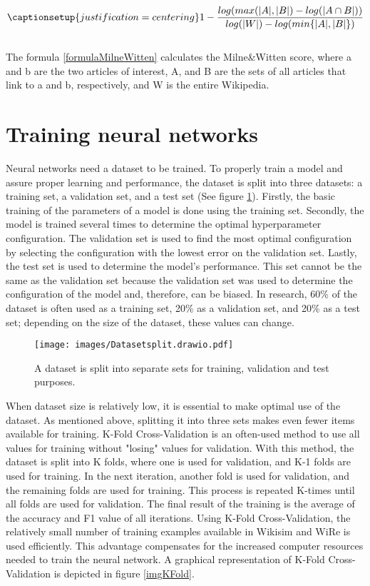 \begin{equation}
\captionsetup{justification=centering}
\label{formulaMilneWitten}
1 -\frac{ log( max( |A|, | B| )-log(| A \cap B|))}{log(|W|)-log(min\{|A|, |B|\})}
\end{equation}
\\ 
The formula \ref{formulaMilneWitten} calculates the Milne\&Witten score, where a and b are the two articles of interest, A, and B are the sets of all articles that link to a and b, respectively, and W is the entire Wikipedia.

\section{Training neural networks}
\label{training}
\label{secTrainingNeuralNetworks}
Neural networks need a dataset to be trained. To properly train a model and assure proper learning and performance, the dataset is split into three datasets: a training set, a validation set, and a test set (See figure \ref{imgTrainValidationTest}). Firstly, the basic training of the parameters of a model is done using the training set. Secondly, the model is trained several times to determine the optimal hyperparameter configuration. The validation set is used to find the most optimal configuration by selecting the configuration with the lowest error on the validation set. Lastly, the test set is used to determine the model's performance. This set cannot be the same as the validation set because the validation set was used to determine the configuration of the model and, therefore, can be biased. In research, 60\% of the dataset is often used as a training set, 20\% as a validation set, and 20\% as a test set; depending on the size of the dataset, these values can change.\\

\begin{figure}[h]
\centering
\captionsetup{justification=centering}
\texttt{[image: images/Datasetsplit.drawio.pdf]}
\caption{A dataset is split into separate sets for training, validation and test purposes.}
\label{imgTrainValidationTest}
\end{figure}


When dataset size is relatively low, it is essential to make optimal use of the dataset. As mentioned above, splitting it into three sets makes even fewer items available for training. K-Fold Cross-Validation is an often-used method to use all values for training without "losing" values for validation. With this method, the dataset is split into K folds, where one is used for validation, and K-1 folds are used for training. In the next iteration, another fold is used for validation, and the remaining folds are used for training. This process is repeated K-times until all folds are used for validation. The final result of the training is the average of the accuracy and F1 value of all iterations. Using K-Fold Cross-Validation, the relatively small number of training examples available in Wikisim and WiRe is used efficiently. This advantage compensates for the increased computer resources needed to train the neural network. A graphical representation of K-Fold Cross-Validation is depicted in figure \ref{imgKFold}.  
\\

